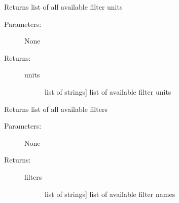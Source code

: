 \documentclass[letterpaper,10pt,english]{sphinxmanual}
\begin{document}
\begin{fulllineitems}
\begin{fulllineitems}
\begin{description}
\begin{description}
\end{description}

\end{description}

\end{fulllineitems}


\begin{fulllineitems}
\label{cluster_slug:slugpy.cluster_slug.cluster_slug.filter_units}
Returns list of all available filter units
\begin{description}
\item[{Parameters:}] \leavevmode
None

\item[{Returns:}] \leavevmode\begin{description}
\item[{units}] \leavevmode{[}list of strings{]}
list of available filter units

\end{description}

\end{description}

\end{fulllineitems}


\begin{fulllineitems}
\label{cluster_slug:slugpy.cluster_slug.cluster_slug.filters}
Returns list of all available filters
\begin{description}
\item[{Parameters:}] \leavevmode
None

\item[{Returns:}] \leavevmode\begin{description}
\item[{filters}] \leavevmode{[}list of strings{]}
list of available filter names

\end{description}

\end{description}

\end{fulllineitems}



\end{fulllineitems}
\end{document}
